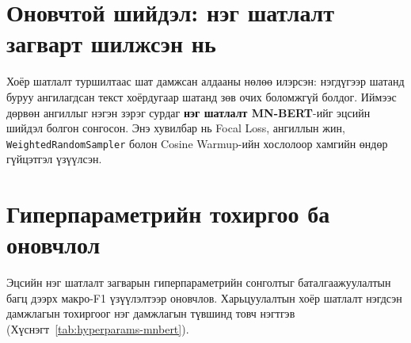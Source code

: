 \section{Оновчтой шийдэл: нэг шатлалт загварт шилжсэн нь}

Хоёр шатлалт туршилтаас шат дамжсан алдааны нөлөө илэрсэн: нэгдүгээр шатанд буруу
ангилагдсан текст хоёрдугаар шатанд зөв очих боломжгүй болдог. Иймээс дөрвөн
ангиллыг нэгэн зэрэг сурдаг \textbf{нэг шатлалт MN-BERT}-ийг эцсийн шийдэл
болгон сонгосон. Энэ хувилбар нь Focal Loss, ангиллын жин,
\texttt{WeightedRandomSampler} болон Cosine Warmup-ийн хослолоор хамгийн өндөр
гүйцэтгэл үзүүлсэн.

\section{Гиперпараметрийн тохиргоо ба оновчлол}

Эцсийн нэг шатлалт загварын гиперпараметрийн сонголтыг баталгаажуулалтын багц
дээрх макро-F1 үзүүлэлтээр оновчлов. Харьцуулалтын хоёр шатлалт нэгдсэн
дамжлагын тохиргоог нэг дамжлагын түвшинд товч нэгтгэв
(Хүснэгт~\ref{tab:hyperparams-mnbert}).

\begin{table}[H]
\centering
\caption{Сургалтын гиперпараметрийн тохиргоо}
\label{tab:hyperparams-mnbert}
\end{table}

